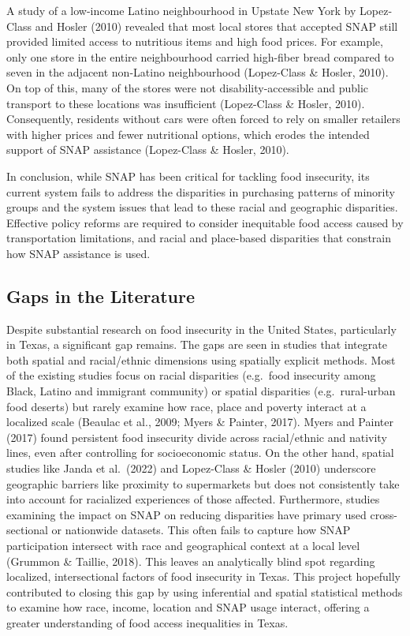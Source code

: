 \documentclass[]{article}
\begin{document}
A study of a low-income Latino neighbourhood in Upstate New York by
Lopez-Class and Hosler (2010) revealed that most local stores that
accepted SNAP still provided limited access to nutritious items and high
food prices. For example, only one store in the entire neighbourhood
carried high-fiber bread compared to seven in the adjacent non-Latino
neighbourhood (Lopez-Class \& Hosler, 2010). On top of this, many of the
stores were not disability-accessible and public transport to these
locations was insufficient (Lopez-Class \& Hosler, 2010). Consequently,
residents without cars were often forced to rely on smaller retailers
with higher prices and fewer nutritional options, which erodes the
intended support of SNAP assistance (Lopez-Class \& Hosler, 2010).

In conclusion, while SNAP has been critical for tackling food
insecurity, its current system fails to address the disparities in
purchasing patterns of minority groups and the system issues that lead
to these racial and geographic disparities. Effective policy reforms are
required to consider inequitable food access caused by transportation
limitations, and racial and place-based disparities that constrain how
SNAP assistance is used.

\subsection{Gaps in the Literature}\label{gaps-in-the-literature}

Despite substantial research on food insecurity in the United States,
particularly in Texas, a significant gap remains. The gaps are seen in
studies that integrate both spatial and racial/ethnic dimensions using
spatially explicit methods. Most of the existing studies focus on racial
disparities (e.g.~food insecurity among Black, Latino and immigrant
community) or spatial disparities (e.g.~rural-urban food deserts) but
rarely examine how race, place and poverty interact at a localized scale
(Beaulac et al., 2009; Myers \& Painter, 2017). Myers and Painter (2017)
found persistent food insecurity divide across racial/ethnic and
nativity lines, even after controlling for socioeconomic status. On the
other hand, spatial studies like Janda et al.~(2022) and Lopez-Class \&
Hosler (2010) underscore geographic barriers like proximity to
supermarkets but does not consistently take into account for racialized
experiences of those affected. Furthermore, studies examining the impact
on SNAP on reducing disparities have primary used cross-sectional or
nationwide datasets. This often fails to capture how SNAP participation
intersect with race and geographical context at a local level (Grummon
\& Taillie, 2018). This leaves an analytically blind spot regarding
localized, intersectional factors of food insecurity in Texas. This
project hopefully contributed to closing this gap by using inferential
and spatial statistical methods to examine how race, income, location
and SNAP usage interact, offering a greater understanding of food access
inequalities in Texas.
\end{document}
